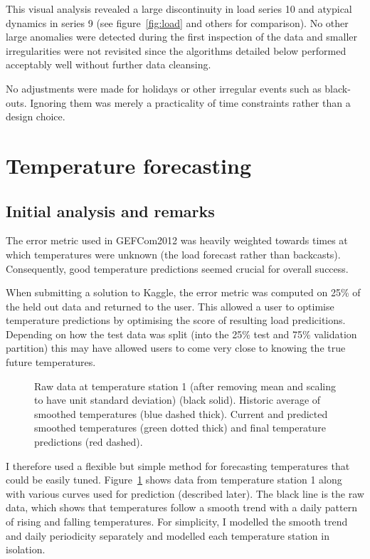 \documentclass[preprint,authoryear,12pt]{elsarticle}
\begin{document}
This visual analysis revealed a large discontinuity in load series 10 and atypical dynamics in series 9 (see figure~\ref{fig:load} and others for comparison).
No other large anomalies were detected during the first inspection of the data and smaller irregularities were not revisited since the algorithms detailed below performed acceptably well without further data cleansing.

No adjustments were made for holidays or other irregular events such as black-outs.
Ignoring them was merely a practicality of time constraints rather than a design choice.

\section{Temperature forecasting}

\label{sec:temp}

\subsection{Initial analysis and remarks}

The error metric used in GEFCom2012 was heavily weighted towards times at which temperatures were unknown (\ie the load forecast rather than backcasts).
Consequently, good temperature predictions seemed crucial for overall success.

When submitting a solution to Kaggle, the error metric was computed on 25\% of the held out data and returned to the user.
This allowed a user to optimise temperature predictions by optimising the score of resulting load predicitions.
Depending on how the test data was split (into the 25\% test and 75\% validation partition) this may have allowed users to come very close to knowing the true future temperatures.

\begin{figure}[ht]
  \begin{center}
    
  \end{center}
  \caption{Raw data at temperature station 1 (after removing mean and scaling to have unit standard deviation) (black solid). Historic average of smoothed temperatures (blue dashed thick). Current and predicted smoothed temperatures (green dotted thick) and final temperature predictions (red dashed).}
  \label{fig:temp_pred}
\end{figure}

I therefore used a flexible but simple method for forecasting temperatures that could be easily tuned.
Figure~\ref{fig:temp_pred} shows data from temperature station 1 along with various curves used for prediction (described later).
The black line is the raw data, which shows that temperatures follow a smooth trend with a daily pattern of rising and falling temperatures.
For simplicity, I modelled the smooth trend and daily periodicity separately and modelled each temperature station in isolation.
\end{document}
